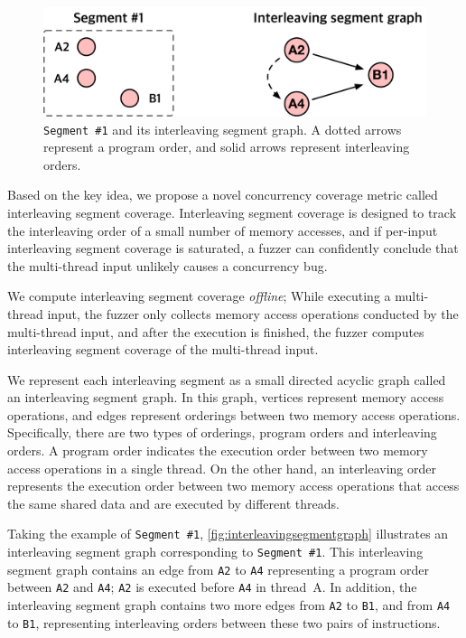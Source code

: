 \newcommand{\mutable}{mutable edge\xspace}
\newcommand{\mutables}{mutable edges\xspace}
\newcommand{\immutable}{immutable edge\xspace}
\newcommand{\immutables}{immutable edges\xspace}

\begin{figure}[t]
  \centering
  \includegraphics[width=0.9\linewidth]{fig/interleavingsegmentgraph.pdf}
  \caption{\texttt{Segment \#1} and its interleaving segment graph. A
    dotted arrows represent a program order, and solid arrows
    represent interleaving orders.}
  \label{fig:interleavingsegmentgraph}
\end{figure}

Based on the key idea, we propose a novel concurrency coverage metric
called interleaving segment coverage.
%
Interleaving segment coverage is designed to track the interleaving
order of a small number of memory accesses, and if per-input
interleaving segment coverage is saturated, a fuzzer can confidently
conclude that the multi-thread input unlikely causes a concurrency
bug.

We compute interleaving segment coverage \textit{offline}; While
executing a multi-thread input, the fuzzer only collects memory access
operations conducted by the multi-thread input, and after the
execution is finished, the fuzzer computes interleaving segment
coverage of the multi-thread input.


%
We represent each interleaving segment as a small directed acyclic
graph called an interleaving segment graph.
%
In this graph, vertices represent memory access operations, and edges
represent orderings between two memory access operations.
%
Specifically, there are two types of orderings, program orders and
interleaving orders.
%
A program order indicates the execution order between two memory
access operations in a single thread.
%
On the other hand, an interleaving order represents the execution
order between two memory access operations that access the same shared
data and are executed by different threads.

Taking the example of \texttt{Segment \#1},
\autoref{fig:interleavingsegmentgraph} illustrates an interleaving
segment graph corresponding to \texttt{Segment \#1}.
%
This interleaving segment graph contains an edge from \texttt{A2} to
\texttt{A4} representing a program order between \texttt{A2} and
\texttt{A4}; \texttt{A2} is executed before \texttt{A4} in thread~A.
%
In addition, the interleaving segment graph contains two more edges
from \texttt{A2} to \texttt{B1}, and from \texttt{A4} to \texttt{B1},
representing interleaving orders between these two pairs of
instructions.


